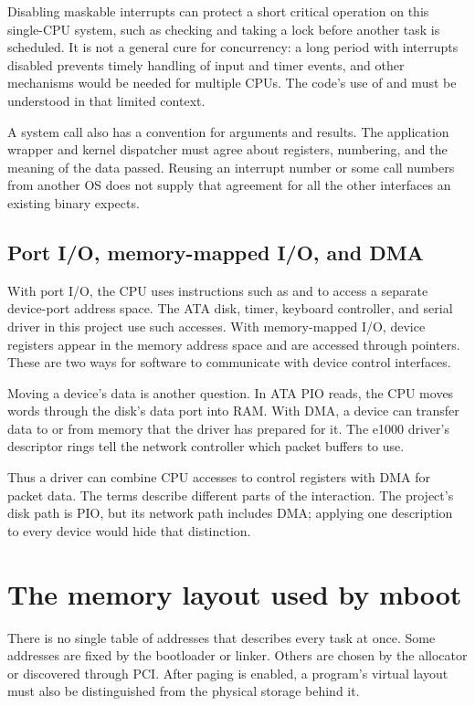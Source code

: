 \documentclass[11pt,a4paper]{scrartcl}
\newcommand{\code}[1]{\texttt{\detokenize{#1}}}
\begin{document}
Disabling maskable interrupts can protect a short critical operation on
this single-CPU system, such as checking and taking a lock before another
task is scheduled. It is not a general cure for concurrency: a long period
with interrupts disabled prevents timely handling of input and timer
events, and other mechanisms would be needed for multiple CPUs. The code's
use of \code{cli} and \code{sti} must be understood in that limited context.

A system call also has a convention for arguments and results. The
application wrapper and kernel dispatcher must agree about registers,
numbering, and the meaning of the data passed. Reusing an interrupt number
or some call numbers from another OS does not supply that agreement for
all the other interfaces an existing binary expects.

\subsection{Port I/O, memory-mapped I/O, and DMA}

With port I/O, the CPU uses instructions such as \code{in} and \code{out}
to access a separate device-port address space. The ATA disk, timer,
keyboard controller, and serial driver in this project use such accesses.
With memory-mapped I/O, device registers appear in the memory address
space and are accessed through pointers. These are two ways for software
to communicate with device control interfaces.

Moving a device's data is another question. In ATA PIO reads, the CPU
moves words through the disk's data port into RAM. With DMA, a device can
transfer data to or from memory that the driver has prepared for it. The
e1000 driver's descriptor rings tell the network controller which packet
buffers to use.

Thus a driver can combine CPU accesses to control registers with DMA for
packet data. The terms describe different parts of the interaction. The
project's disk path is PIO, but its network path includes DMA; applying
one description to every device would hide that distinction.

\section{The memory layout used by mboot}
\label{app:memory}

There is no single table of addresses that describes every task at once.
Some addresses are fixed by the bootloader or linker. Others are chosen
by the allocator or discovered through PCI. After paging is enabled, a
program's virtual layout must also be distinguished from the physical
storage behind it.
\end{document}
